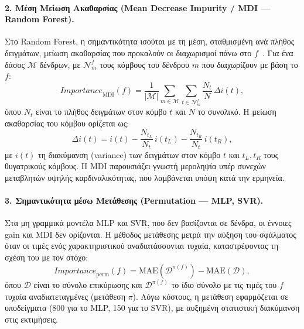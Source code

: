 \paragraph*{2. Μέση Μείωση Ακαθαρσίας (Mean Decrease Impurity / MDI --- Random Forest).}
Στο Random Forest, η σημαντικότητα ισούται με τη μέση, σταθμισμένη ανά πλήθος δειγμάτων,
μείωση ακαθαρσίας που προκαλούν οι διαχωρισμοί πάνω στο $f$~\cite{breiman2001rf}. Για ένα
δάσος $\mathcal{M}$ δένδρων, με $\mathcal{N}_m^{f}$ τους κόμβους του δένδρου $m$ που
διαχωρίζουν με βάση το $f$:
\begin{equation}
    \mathit{Importance}_{\mathrm{MDI}}(f) =
    \frac{1}{|\mathcal{M}|} \sum_{m \in \mathcal{M}}
    \sum_{t \in \mathcal{N}_m^{f}} \frac{N_t}{N}\, \Delta i(t),
    \label{eq:fi_mdi}
\end{equation}
όπου $N_t$ είναι το πλήθος δειγμάτων στον κόμβο $t$ και $N$ το συνολικό. Η μείωση
ακαθαρσίας του κόμβου ορίζεται ως:
\begin{equation}
    \Delta i(t) = i(t) - \frac{N_{t_L}}{N_t}\, i(t_L) - \frac{N_{t_R}}{N_t}\, i(t_R),
    \label{eq:fi_mdi_delta}
\end{equation}
με $i(t)$ τη διακύμανση (variance) των δειγμάτων στον κόμβο $t$ και $t_L, t_R$ τους
θυγατρικούς κόμβους. Η MDI παρουσιάζει γνωστή μεροληψία υπέρ συνεχών μεταβλητών υψηλής
καρδιναλικότητας, που λαμβάνεται υπόψη κατά την ερμηνεία.

\paragraph*{3. Σημαντικότητα μέσω Μετάθεσης (Permutation --- MLP, SVR).}
Στα μη γραμμικά μοντέλα MLP και SVR, που δεν βασίζονται σε δένδρα, οι έννοιες gain και
MDI δεν ορίζονται. Η μέθοδος μετάθεσης μετρά την αύξηση του σφάλματος όταν οι τιμές ενός
χαρακτηριστικού αναδιατάσσονται τυχαία, καταστρέφοντας τη σχέση του με τον στόχο:
\begin{equation}
    \mathit{Importance}_{\mathrm{perm}}(f) =
    \mathrm{MAE}\!\left(\mathcal{D}^{\pi(f)}\right) - \mathrm{MAE}(\mathcal{D}),
    \label{eq:fi_perm}
\end{equation}
όπου $\mathcal{D}$ είναι το σύνολο επικύρωσης και $\mathcal{D}^{\pi(f)}$ το ίδιο σύνολο με
τις τιμές του $f$ τυχαία αναδιατεταγμένες (μετάθεση $\pi$). Λόγω κόστους, η μετάθεση
εφαρμόζεται σε υποδείγματα (800 για το MLP, 150 για το SVR), με αυξημένη στατιστική
διακύμανση στις εκτιμήσεις.

